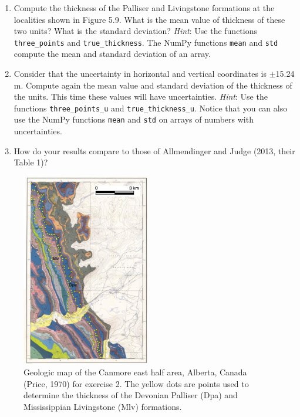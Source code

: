 \documentclass[a4paper , 12pt]{book}
\newcommand{\code}[1]{\colorbox{light-gray}{\texttt{#1}}}
\begin{document}
\begin{enumerate}
    \begin{enumerate}
        \item Compute the thickness of the Palliser and Livingstone formations at the localities shown in Figure 5.9. What is the mean value of thickness of these two units? What is the standard deviation? \textit{Hint}: Use the functions \code{three\_points} and \code{true\_thickness}. The NumPy functions \code{mean} and \code{std} compute the mean and standard deviation of an array.
        \item Consider that the uncertainty in horizontal and vertical coordinates is $\pm$15.24 m. Compute again the mean value and standard deviation of the thickness of the units. This time these values will have uncertainties. \textit{Hint}: Use the functions \code{three\_points\_u} and \code{true\_thickness\_u}. Notice that you can also use the NumPy functions \code{mean} and \code{std} on arrays of numbers with uncertainties.
        \item How do your results compare to those of Allmendinger and Judge (2013, their Table 1)?
    \end{enumerate}{}
    
    \begin{figure}
        \caption{Geologic map of the Canmore east half area, Alberta, Canada (Price, 1970) for exercise 2. The yellow dots are points used to determine the thickness of the Devonian Palliser (Dpa) and Mississippian Livingstone (Mlv) formations.}
        \includegraphics[width=0.5\textwidth]{ch5f14.pdf}
    \end{figure}
    

\end{enumerate}
\end{document}
